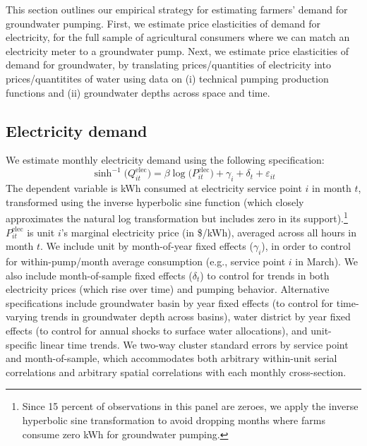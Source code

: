 %
%

This section outlines our empirical strategy for estimating farmers' demand for groundwater pumping. First, we estimate price elasticities of demand for electricity, for the full sample of agricultural consumers where we can match an electricity meter to a groundwater pump. Next, we estimate price elasticities of demand for groundwater, by translating prices/quantities of electricity into prices/quantitites of water using data on (i) technical pumping production functions and (ii) groundwater depths across space and time.

\subsection{Electricity demand}\label{sec:empirics_elec}

We estimate monthly electricity demand using the following specification:
\begin{equation}
\sinh^{-1}\big(Q^{\text{elec}}_{it}\big) = \beta \log\big(P^{\text{elec}}_{it}\big) + \gamma_{i} + \delta_t + \varepsilon_{it}
\label{eq:reg_elec}
\end{equation}
The dependent variable is kWh consumed at electricity service point $i$ in month $t$, transformed using the inverse hyperbolic sine function (which closely approximates the natural log transformation but includes zero in its support).\footnote{
Since 15 percent of observations in this panel are zeroes, we apply the inverse hyperbolic sine transformation to avoid dropping months where farms consume zero kWh for groundwater pumping.
}
$P^{\text{elec}}_{it}$ is unit $i$'s marginal electricity price (in \$/kWh), averaged across all hours in month $t$. We include unit by month-of-year fixed effects ($\gamma_i$), in order to control for within-pump/month average consumption (e.g., service point $i$ in March). We also include month-of-sample fixed effects ($\delta_t$) to control for trends in both electricity prices (which rise over time) and pumping behavior. Alternative specifications include groundwater basin by year fixed effects (to control for time-varying trends in groundwater depth across basins), water district by year fixed effects (to control for annual shocks to surface water allocations), and unit-specific linear time trends.
We two-way cluster standard errors by service point and month-of-sample, which accommodates both arbitrary within-unit serial correlations and arbitrary spatial correlations with each monthly cross-section.

